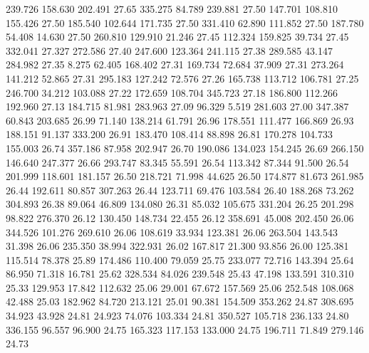 239.726  158.630  202.491        27.65
 335.275   84.789  239.881        27.50
 147.701  108.810  155.426        27.50
 185.540  102.644  171.735        27.50
 331.410   62.890  111.852        27.50
 187.780   54.408   14.630        27.50
 260.810  129.910   21.246        27.45
 112.324  159.825   39.734        27.45
 332.041   27.327  272.586        27.40
 247.600  123.364  241.115        27.38
 289.585   43.147  284.982        27.35
   8.275   62.405  168.402        27.31
 169.734   72.684   37.909        27.31
 273.264  141.212   52.865        27.31
 295.183  127.242   72.576        27.26
 165.738  113.712  106.781        27.25
 246.700   34.212  103.088        27.22
 172.659  108.704  345.723        27.18
 186.800  112.266  192.960        27.13
 184.715   81.981  283.963        27.09
  96.329    5.519  281.603        27.00
 347.387   60.843  203.685        26.99
  71.140  138.214   61.791        26.96
 178.551  111.477  166.869        26.93
 188.151   91.137  333.200        26.91
 183.470  108.414   88.898        26.81
 170.278  104.733  155.003        26.74
 357.186   87.958  202.947        26.70
 190.086  134.023  154.245        26.69
 266.150  146.640  247.377        26.66
 293.747   83.345   55.591        26.54
 113.342   87.344   91.500        26.54
 201.999  118.601  181.157        26.50
 218.721   71.998   44.625        26.50
 174.877   81.673  261.985        26.44
 192.611   80.857  307.263        26.44
 123.711   69.476  103.584        26.40
 188.268   73.262  304.893        26.38
  89.064   46.809  134.080        26.31
  85.032  105.675  331.204        26.25
 201.298   98.822  276.370        26.12
 130.450  148.734   22.455        26.12
 358.691   45.008  202.450        26.06
 344.526  101.276  269.610        26.06
 108.619   33.934  123.381        26.06
 263.504  143.543   31.398        26.06
 235.350   38.994  322.931        26.02
 167.817   21.300   93.856        26.00
 125.381  115.514   78.378        25.89
 174.486  110.400   79.059        25.75
 233.077   72.716  143.394        25.64
  86.950   71.318   16.781        25.62
 328.534   84.026  239.548        25.43
  47.198  133.591  310.310        25.33
 129.953   17.842  112.632        25.06
  29.001   67.672  157.569        25.06
 252.548  108.068   42.488        25.03
 182.962   84.720  213.121        25.01
  90.381  154.509  353.262        24.87
 308.695   34.923   43.928        24.81
  24.923   74.076  103.334        24.81
 350.527  105.718  236.133        24.80
 336.155   96.557   96.900        24.75
 165.323  117.153  133.000        24.75
 196.711   71.849  279.146        24.73
